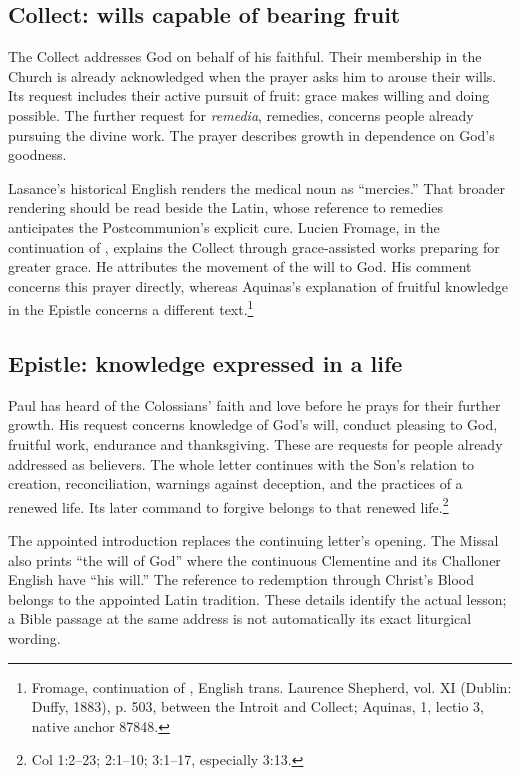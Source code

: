 \subsection{Collect: wills capable of bearing fruit}

The Collect addresses God on behalf of his faithful. Their membership in
the Church is already acknowledged when the prayer asks him to arouse
their wills. Its request includes their active pursuit of fruit:
grace makes willing and doing possible. The further request for
\textit{remedia}, remedies, concerns people already pursuing the divine
work. The prayer describes growth in dependence on God's goodness.

Lasance's historical English renders the medical noun as ``mercies.''
That broader rendering should be read beside the Latin, whose reference
to remedies anticipates the Postcommunion's explicit cure. Lucien Fromage,
in the continuation of , explains the Collect
through grace-assisted works preparing for greater grace. He attributes
the movement of the will to God. His comment concerns this prayer
directly, whereas Aquinas's explanation of fruitful knowledge in the
Epistle concerns a different text.\footnote{Fromage, continuation of
, English trans. Laurence Shepherd, vol. XI
(Dublin: Duffy, 1883), p. 503, between the Introit and Collect; Aquinas,
 1, lectio 3, native anchor 87848.}

\subsection{Epistle: knowledge expressed in a life}

Paul has heard of the Colossians' faith and love before he prays for their
further growth. His request concerns knowledge of God's will, conduct
pleasing to God, fruitful work, endurance and thanksgiving. These are
requests for people already addressed as believers. The whole letter
continues with the Son's relation to creation, reconciliation, warnings
against deception, and the practices of a renewed life. Its later command
to forgive belongs to that renewed life.\footnote{Col 1:2--23;
2:1--10; 3:1--17, especially 3:13.}

The appointed introduction replaces the continuing letter's opening.
The Missal also prints ``the will of God'' where the continuous
Clementine and its Challoner English have ``his will.'' The reference to
redemption through Christ's Blood belongs to the appointed Latin
tradition. These details identify the actual lesson; a Bible passage at
the same address is not automatically its exact liturgical wording.

